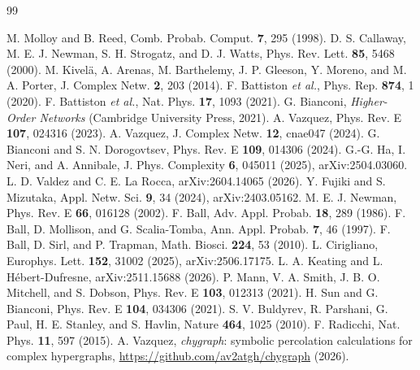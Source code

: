 \documentclass[aps,pre,twocolumn,superscriptaddress,floatfix,longbibliography]{revtex4-2}
\begin{document}
\begin{thebibliography}{99}

 M. Molloy and B. Reed,
  Comb. Probab. Comput. \textbf{7}, 295 (1998).
 D. S. Callaway, M. E. J. Newman, S. H. Strogatz, and
  D. J. Watts, Phys. Rev. Lett. \textbf{85}, 5468 (2000).
 M. Kivel\"a, A. Arenas, M. Barthelemy, J. P. Gleeson,
  Y. Moreno, and M. A. Porter, J. Complex Netw. \textbf{2}, 203 (2014).
 F. Battiston \textit{et al.},
  Phys. Rep. \textbf{874}, 1 (2020).
 F. Battiston \textit{et al.},
  Nat. Phys. \textbf{17}, 1093 (2021).
 G. Bianconi, \textit{Higher-Order Networks}
  (Cambridge University Press, 2021).
 A. Vazquez, Phys. Rev. E \textbf{107}, 024316 (2023).
 A. Vazquez, J. Complex Netw. \textbf{12}, cnae047
  (2024).
 G. Bianconi and S. N. Dorogovtsev,
  Phys. Rev. E \textbf{109}, 014306 (2024).
 G.-G. Ha, I. Neri, and A. Annibale,
  J. Phys. Complexity \textbf{6}, 045011 (2025), arXiv:2504.03060.
 L. D. Valdez and C. E. La Rocca,
  arXiv:2604.14065 (2026).
 Y. Fujiki and S. Mizutaka,
  Appl. Netw. Sci. \textbf{9}, 34 (2024), arXiv:2403.05162.
 M. E. J. Newman, Phys. Rev. E \textbf{66}, 016128 (2002).
 F. Ball, Adv. Appl. Probab. \textbf{18}, 289 (1986).
 F. Ball, D. Mollison, and G. Scalia-Tomba,
  Ann. Appl. Probab. \textbf{7}, 46 (1997).
 F. Ball, D. Sirl, and P. Trapman,
  Math. Biosci. \textbf{224}, 53 (2010).
 L. Cirigliano, Europhys. Lett. \textbf{152}, 31002
  (2025), arXiv:2506.17175.
 L. A. Keating and L. H\'ebert-Dufresne,
  arXiv:2511.15688 (2026).
 P. Mann, V. A. Smith, J. B. O. Mitchell, and S. Dobson,
  Phys. Rev. E \textbf{103}, 012313 (2021).
 H. Sun and G. Bianconi, Phys. Rev. E \textbf{104}, 034306
  (2021).
 S. V. Buldyrev, R. Parshani, G. Paul, H. E. Stanley, and
  S. Havlin, Nature \textbf{464}, 1025 (2010).
 F. Radicchi, Nat. Phys. \textbf{11}, 597 (2015).
 A. Vazquez, \emph{chygraph}: symbolic percolation
  calculations for complex hypergraphs,
  \url{https://github.com/av2atgh/chygraph} (2026).

\end{thebibliography}
\end{document}
